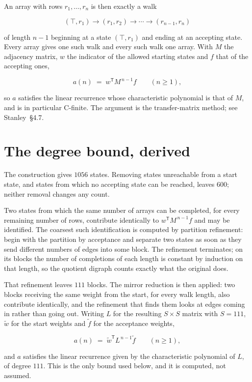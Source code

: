 \documentclass[11pt]{article}
\theoremstyle{definition}
\begin{document}
An array with rows $r_1,\dots,r_n$ is then exactly a walk

\[(\top,r_1) \to (r_1,r_2) \to \cdots \to (r_{n-1},r_n)\]

of length $n-1$ beginning at a state $(\top,r_1)$ and ending at an accepting state. Every array gives one such walk and every such walk one array. With $M$ the adjacency matrix, $w$ the indicator of the allowed starting states and $f$ that of the accepting ones,

\[a(n) \;=\; w^{\mathsf T} M^{\,n-1} f \qquad (n \ge 1),\]

so $a$ satisfies the linear recurrence whose characteristic polynomial is that of $M$, and is in particular C-finite. The argument is the transfer-matrix method; see Stanley~\S4.7.

\section{The degree bound, derived}

The construction gives $1056$ states. Removing states unreachable from a start state, and states from which no accepting state can be reached, leaves $600$; neither removal changes any count.

Two states from which the same number of arrays can be completed, for every remaining number of rows, contribute identically to $w^{\mathsf T}M^{\,n-1}f$ and may be identified. The coarsest such identification is computed by partition refinement: begin with the partition by acceptance and separate two states as soon as they send different numbers of edges into some block. The refinement terminates; on its blocks the number of completions of each length is constant by induction on that length, so the quotient digraph counts exactly what the original does.

That refinement leaves $111$ blocks. The mirror reduction is then applied: two blocks receiving the same weight from the start, for every walk length, also contribute identically, and the refinement that finds them looks at edges coming in rather than going out. Writing $L$ for the resulting $S \times S$ matrix with $S = 111$, $\tilde w$ for the start weights and $\tilde f$ for the acceptance weights,

\[a(n) \;=\; \tilde w^{\mathsf T} L^{\,n-1} \tilde f \qquad (n \ge 1),\]

and $a$ satisfies the linear recurrence given by the characteristic polynomial of $L$, of degree $111$. This is the only bound used below, and it is computed, not assumed.
\end{document}
